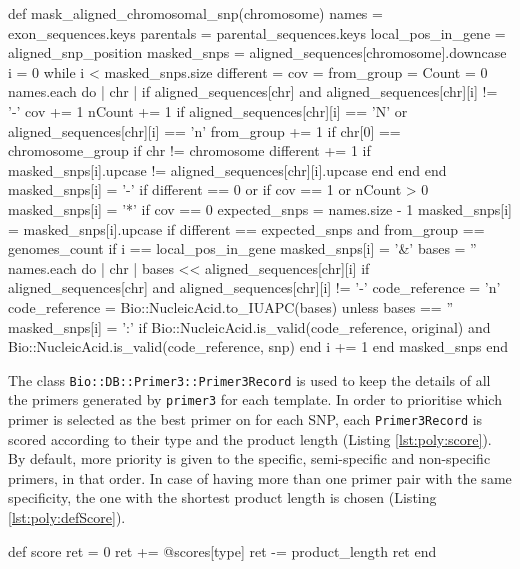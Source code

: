\begin{code}[language=Ruby,caption={[\texttt{Bio::PolyploidTools::SNP.mask\_aligned\_chromosomal\_snp}] Method in \texttt{Bio::PolyploidTools::SNP} that calculates the mask of the alignment}, label=lst:poly:mask]
def mask_aligned_chromosomal_snp(chromosome)
  names = exon_sequences.keys
  parentals =  parental_sequences.keys
  local_pos_in_gene = aligned_snp_position
  masked_snps = aligned_sequences[chromosome].downcase
  i = 0
  while i < masked_snps.size
    different = cov = from_group = Count = 0
    names.each do | chr |
      if aligned_sequences[chr] and aligned_sequences[chr][i]  != '-'
        cov += 1 
        nCount += 1 if aligned_sequences[chr][i] == 'N' or  aligned_sequences[chr][i] == 'n' 
        from_group += 1 if chr[0] == chromosome_group
        if chr != chromosome 
          different += 1  if masked_snps[i].upcase != aligned_sequences[chr][i].upcase 
        end
      end
    end
    masked_snps[i] = '-' if different == 0 or if cov == 1 or nCount > 0
    masked_snps[i] = '*' if cov == 0
    expected_snps = names.size - 1 
    masked_snps[i] = masked_snps[i].upcase if different == expected_snps and from_group == genomes_count
    if i == local_pos_in_gene
      masked_snps[i] = '&'
      bases = ''
      names.each do | chr | { bases << aligned_sequences[chr][i]  if aligned_sequences[chr] and aligned_sequences[chr][i]  != '-' }
      code_reference = 'n'
      code_reference = Bio::NucleicAcid.to_IUAPC(bases) unless bases == ''
      masked_snps[i] = ':' if Bio::NucleicAcid.is_valid(code_reference,   original) and Bio::NucleicAcid.is_valid(code_reference,   snp)
    end
  i += 1
  end
  masked_snps
end
\end{code}

The class \texttt{Bio::DB::Primer3::Primer3Record} is used to keep the details of all the primers generated by \verb|primer3| for each template. 
In order to prioritise which primer is selected as the best primer on for each SNP, each \verb|Primer3Record| is scored according to their type and the product length (Listing \ref{lst:poly:score}).
By default, more priority is given to the specific, semi-specific and non-specific primers, in that order. 
In case of having more than one primer pair with the same specificity, the one with the shortest product length is chosen (Listing \ref{lst:poly:defScore}).  


\begin{code}[language=Ruby,caption={[\texttt{Bio::DB::Primer3::Primer3Record.score}]Method that calculates the score of a primer \texttt{Bio::DB::Primer3::Primer3Record}}, label=lst:poly:score]
def score
  ret = 0
  ret += @scores[type]
  ret -= product_length
  ret
end
\end{code}

